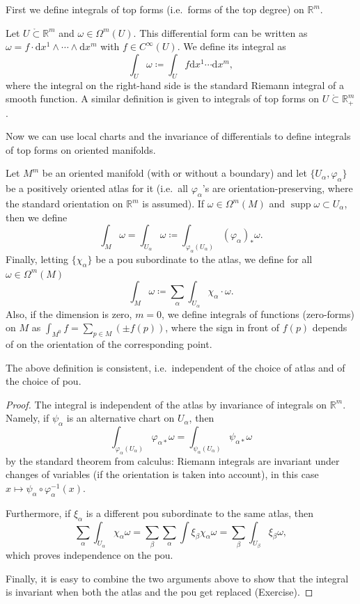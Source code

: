 \documentclass[english,letterpaper]{article}%
\numberwithin{equation}{section}
\numberwithin{figure}{section}
\numberwithin{table}{section}
\theoremstyle{definition}
\theoremstyle{definition}
\theoremstyle{definition}
\theoremstyle{plain}
\theoremstyle{plain}
\theoremstyle{plain}
\theoremstyle{plain}
\theoremstyle{remark}
\theoremstyle{remark}
\newcommand{\dd}{{\mathrm{d}}}
\DeclareMathOperator{\supp}{supp}
\begin{document}
First we define integrals of top forms (i.e.\ forms of the top degree) on $\mathbb{R}^m$.
\begin{defn}
Let $U\mathring\subset \mathbb{R}^m$ and $\omega\in \Omega^m(U)$. This differential form can be written as $\omega=f\cdot \dd x^1\wedge\cdots\wedge\dd x^m $ with $f\in C^\infty(U)$. We define its integral as
\[\int_U\omega \coloneqq \int_U f \dd x^1\cdots\dd x^m,\]
where the integral on the right-hand side is the standard Riemann integral of a smooth function. A similar definition is given to integrals of top forms on $U\mathring\subset \mathbb{R}^m_+$.
\end{defn}

Now we can use local charts and the invariance of differentials to define integrals of top forms on oriented manifolds.

\begin{defn}
Let $M^m$ be an oriented manifold (with or without a boundary) and let $\{U_\alpha,\varphi_\alpha\}$ be a positively oriented atlas for it (i.e.\ all $\varphi_\alpha$'s are orientation-preserving, where the standard orientation on $\mathbb{R}^m$ is assumed). If $\omega\in\Omega^m(M)$ and $\supp\omega\subset U_\alpha$, then we define
\[\int_M \omega= \int_{U_\alpha}\omega \coloneqq \int_{\varphi_\alpha( U_\alpha)}(\varphi_\alpha)_\ast \omega.\]
Finally, letting $\{\chi_\alpha\}$ be a \gls{pou} subordinate to the atlas, we define for all $\omega\in\Omega^m(M)$
\[\int_M \omega\coloneqq \sum_\alpha \int_{U_\alpha}\chi_\alpha\cdot\omega.\]
Also, if the dimension is zero, $m=0$, we define integrals of functions (zero-forms) on $M$ as $\int_{M^0}f=\sum_{p\in M}(\pm f(p))$, where the sign in front of $f(p)$ depends of on the orientation of the corresponding point.
\end{defn}


\begin{prop}
The above definition is consistent, i.e.\ independent of the choice of atlas and of the choice of \gls{pou}.
\end{prop}
\begin{proof}
The integral is independent of the atlas by invariance of integrals on $\mathbb{R}^m$. Namely, if $\psi_\alpha$ is an alternative chart on $U_\alpha$, then
\[\int_{\varphi_\alpha(U_\alpha)}\varphi_{\alpha\ast}\omega=\int_{\psi_\alpha(U_\alpha)}\psi_{\alpha\ast}\omega\]
by the standard theorem from calculus: Riemann integrals are invariant under changes of variables (if the orientation is taken into account), in this case $x\mapsto \psi_\alpha\circ\varphi_\alpha^{-1}(x)$.

Furthermore, if $\xi_\alpha$ is a different \gls{pou} subordinate to the same atlas, then
\[\sum_\alpha\int_{U_\alpha}\chi_\alpha\omega=\sum_\beta\sum_\alpha\int \xi_\beta\chi_\alpha\omega=\sum_\beta\int_{U_\beta}\xi_\beta\omega,\]
which proves independence on the \gls{pou}.

Finally, it is easy to combine the two arguments above to show that the integral is invariant when both the atlas and the \gls{pou} get replaced (Exercise).
\end{proof}
\end{document}
